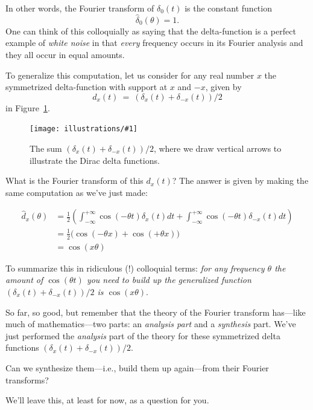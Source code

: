 \documentclass[openany]{book}
\newcommand{\ill}[3]{%
   \begin{figure}[H]%
   \vspace{-2ex}
   \centering%
   \texttt{[image: illustrations/\#1]}%
   \caption{#3}%
   \vspace{-2ex}
    \end{figure}}
\theoremstyle{plain}
\theoremstyle{definition}
\begin{document}
{In other words, the Fourier transform of $\delta_0(t)$ is the constant
function $$ {\hat \delta_0}(\theta)=1.$$ One can think of this
colloquially as saying that the delta-function is a perfect example of
{\it white noise} in that {\it every} frequency occurs in its Fourier
analysis and they all occur in equal amounts.

To generalize this computation, let us consider for any real number $x$
the symmetrized delta-function with support at $x$ and $-x$, given
by $$d_x(t) \ = \ (\delta_x(t) + \delta_{-x}(t))/2$$
in Figure~\ref{fig:two_delta}.

    \ill{two_delta}{0.4}{The sum $(\delta_x(t) + \delta_{-x}(t))/2$, where we draw vertical arrows to illustrate the Dirac delta functions.\label{fig:two_delta}}

    What is the Fourier transform of this $d_x(t)$?  The answer is
    given by making the same computation as we've just made:

\begin{align*}\label{dx}
{\hat d_x}(\theta)  &=  {\frac{1}{2}}\left(\int_{-\infty}^{+\infty}\cos(-\theta t)\delta_x(t)dt + \int_{-\infty}^{+\infty}\cos(-\theta t)\delta_{-x}(t)dt\right)\\
    &= {\frac{1}{2}}\big(\cos(-\theta x)+ \cos(+\theta x)\big)\\
    &= \cos(x\theta)
\end{align*}


To summarize this in ridiculous (!) colloquial terms: {\it for any
  frequency $\theta$ the amount of $\cos(\theta t)$ you need to build
  up the generalized function $(\delta_x(t) + \delta_{-x}(t))/2$ is
  $\cos(x\theta).$ }


So far, so good, but remember that the theory of the Fourier transform
has---like much of mathematics---two parts: an {\it analysis part} and
a {\it synthesis} part.  We've just performed the {\it analysis} part
of the theory for these symmetrized delta functions $(\delta_x(t) +
\delta_{-x}(t))/2$.

Can we synthesize them---i.e., build them up again---from their Fourier transforms?


  We'll leave this, at least for now, as a question for you.



}
\end{document}
